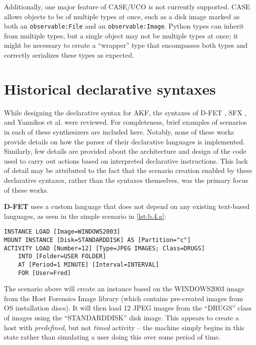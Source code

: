 Additionally, one major feature of CASE/UCO is not currently supported.
CASE allows objects to be of multiple types at once, such as a disk
image marked as both an \passthrough{\lstinline!observable:File!} and an
\passthrough{\lstinline!observable:Image!}. Python types can inherit
from multiple types, but a single object may not be multiple types at
once; it might be necessary to create a ``wrapper'' type that
encompasses both types and correctly serializes these types as expected.

\section{Historical declarative
syntaxes}\label{historical-declarative-syntaxes}

While designing the declarative syntax for AKF, the syntaxes of D-FET
\cite{williamCloudbasedDigitalForensics2011}, SFX
\cite{russellForensicImageDescription2012}, and Yannikos et al.
\cite{yannikosDataCorporaDigital2014} were reviewed. For
completeness, brief examples of scenarios in each of these synthesizers
are included here. Notably, none of these works provide details on how
the parser of their declarative languages is implemented. Similarly, few
details are provided about the architecture and design of the code used
to carry out actions based on interpreted declarative instructions. This
lack of detail may be attributed to the fact that the scenario creation
enabled by these declarative syntaxes, rather than the syntaxes
themselves, was the primary focus of these works.

\textbf{D-FET} \cite{williamCloudbasedDigitalForensics2011} uses a
custom language that does not depend on any existing text-based
languages, as seen in the simple scenario in \autoref{lst:b.4.a}:

\begin{lstlisting}[label={lst:b.4.a}, caption={Sample D-FET declarative scenario without events \cite{williamCloudbasedDigitalForensics2011}}, ]
INSTANCE LOAD [Image=WINDOWS2003] 
MOUNT INSTANCE [Disk=STANDARDDISK] AS [Partition="c"] 
ACTIVITY LOAD [Number=12] [Type=JPEG IMAGES; Class=DRUGS] 
    INTO [Folder=USER FOLDER] 
    AT [Period=1 MINUTE] [Interval=INTERVAL] 
    FOR [User=Fred]
\end{lstlisting}

The scenario above will create an instance based on the WINDOWS2003
image from the Host Forensics Image library (which contains pre-created
images from OS installation discs). It will then load 12 JPEG images
from the ``DRUGS'' class of images using the ``STANDARDDISK'' disk
image. This appears to create a host with \emph{predefined}, but not
\emph{timed} activity -- the machine simply begins in this state rather
than simulating a user doing this over some period of time.

